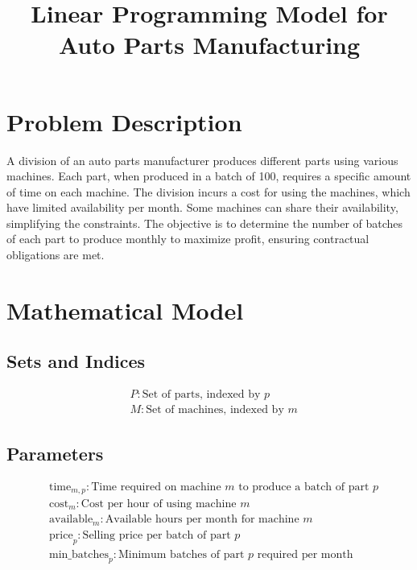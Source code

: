\documentclass{article}
\begin{document}
\title{Linear Programming Model for Auto Parts Manufacturing}
\author{}
\date{}
\maketitle

\section*{Problem Description}

A division of an auto parts manufacturer produces different parts using various machines. Each part, when produced in a batch of 100, requires a specific amount of time on each machine. The division incurs a cost for using the machines, which have limited availability per month. Some machines can share their availability, simplifying the constraints. The objective is to determine the number of batches of each part to produce monthly to maximize profit, ensuring contractual obligations are met.

\section*{Mathematical Model}

\subsection*{Sets and Indices}
\begin{align*}
& P: \text{Set of parts, indexed by } p \\
& M: \text{Set of machines, indexed by } m 
\end{align*}

\subsection*{Parameters}
\begin{align*}
& \text{time}_{m,p}: \text{Time required on machine } m \text{ to produce a batch of part } p \\
& \text{cost}_{m}: \text{Cost per hour of using machine } m \\
& \text{available}_{m}: \text{Available hours per month for machine } m \\
& \text{price}_{p}: \text{Selling price per batch of part } p \\
& \text{min\_batches}_{p}: \text{Minimum batches of part } p \text{ required per month}
\end{align*}
\end{document}
